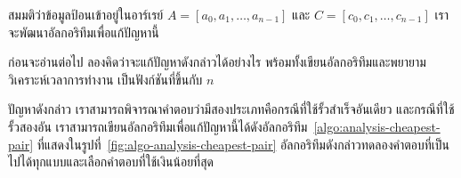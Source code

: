 สมมติ{\wbr}ว่า{\wbr}ข้อมูล{\wbr}ป้อน{\wbr}เข้า{\wbr}อยู่{\wbr}ใน{\wbr}อาร์เรย์ $A=[a_0,a_1,\ldots,a_{n-1}]$ และ{\wbr}
$C=[c_0,c_1,\ldots,c_{n-1}]$  เรา{\wbr}จะ{\wbr}พัฒนา{\wbr}อัล{\wbr}กอ{\wbr}ริ{\wbr}ทึม{\wbr}เพื่อ{\wbr}แก้{\wbr}ปัญหา{\wbr}นี้{\wbr}

\begin{quiz}{}
ก่อน{\wbr}จะ{\wbr}อ่าน{\wbr}ต่อไป ลอง{\wbr}คิด{\wbr}ว่า{\wbr}จะ{\wbr}แก้{\wbr}ปัญหา{\wbr}ดังกล่าว{\wbr}ได้{\wbr}อย่างไร{\wbr}
พร้อมทั้ง{\wbr}เขียน{\wbr}อัล{\wbr}กอ{\wbr}ริ{\wbr}ทึม{\wbr}และ{\wbr}พยายาม{\wbr}วิเคราะห์{\wbr}เวลา{\wbr}การ{\wbr}ทำงาน เป็น{\wbr}ฟังก์ชัน{\wbr}ที่{\wbr}ขึ้น{\wbr}กับ $n$
\end{quiz}

ปัญหา{\wbr}ดังกล่าว เรา{\wbr}สามารถ{\wbr}พิจารณา{\wbr}คำตอบ{\wbr}ว่า{\wbr}มี{\wbr}สอง{\wbr}ประเภท{\wbr}คือ{\wbr}กรณี{\wbr}ที่{\wbr}ใช้{\wbr}รั้ว{\wbr}สำเร็จ{\wbr}อัน{\wbr}เดียว{\wbr}
และ{\wbr}กรณี{\wbr}ที่{\wbr}ใช้{\wbr}รั้ว{\wbr}สอง{\wbr}อัน{\wbr}
เรา{\wbr}สามารถ{\wbr}เขียน{\wbr}อัล{\wbr}กอ{\wbr}ริ{\wbr}ทึม{\wbr}เพื่อ{\wbr}แก้{\wbr}ปัญหา{\wbr}นี้{\wbr}ได้{\wbr}ดัง{\wbr}อัล{\wbr}กอ{\wbr}ริ{\wbr}ทึม~\ref{algo:analysis-cheapest-pair}
ที่{\wbr}แสดง{\wbr}ใน{\wbr}รูป{\wbr}ที่~\ref{fig:algo-analysis-cheapest-pair}
อัล{\wbr}กอ{\wbr}ริ{\wbr}ทึม{\wbr}ดังกล่าว{\wbr}ทดลอง{\wbr}คำตอบ{\wbr}ที่{\wbr}เป็น{\wbr}ไป{\wbr}ได้{\wbr}ทุก{\wbr}แบบ{\wbr}และ{\wbr}เลือก{\wbr}คำตอบ{\wbr}ที่{\wbr}ใช้{\wbr}เงิน{\wbr}น้อย{\wbr}ที่สุด{\wbr}

